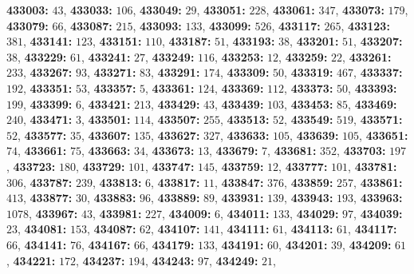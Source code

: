\textsf{\bfseries 433003:} $43$, \textsf{\bfseries 433033:} $106$, \textsf{\bfseries 433049:} $29$, \textsf{\bfseries 433051:} $228$, \textsf{\bfseries 433061:} $347$, \textsf{\bfseries 433073:} $179$, \textsf{\bfseries 433079:} $66$, \textsf{\bfseries 433087:} $215$, \textsf{\bfseries 433093:} $133$, \textsf{\bfseries 433099:} $526$, \textsf{\bfseries 433117:} $265$, \textsf{\bfseries 433123:} $381$, \textsf{\bfseries 433141:} $123$, \textsf{\bfseries 433151:} $110$, \textsf{\bfseries 433187:} $51$, \textsf{\bfseries 433193:} $38$, \textsf{\bfseries 433201:} $51$, \textsf{\bfseries 433207:} $38$, \textsf{\bfseries 433229:} $61$, \textsf{\bfseries 433241:} $27$, \textsf{\bfseries 433249:} $116$, \textsf{\bfseries 433253:} $12$, \textsf{\bfseries 433259:} $22$, \textsf{\bfseries 433261:} $233$, \textsf{\bfseries 433267:} $93$, \textsf{\bfseries 433271:} $83$, \textsf{\bfseries 433291:} $174$, \textsf{\bfseries 433309:} $50$, \textsf{\bfseries 433319:} $467$, \textsf{\bfseries 433337:} $192$, \textsf{\bfseries 433351:} $53$, \textsf{\bfseries 433357:} $5$, \textsf{\bfseries 433361:} $124$, \textsf{\bfseries 433369:} $112$, \textsf{\bfseries 433373:} $50$, \textsf{\bfseries 433393:} $199$, \textsf{\bfseries 433399:} $6$, \textsf{\bfseries 433421:} $213$, \textsf{\bfseries 433429:} $43$, \textsf{\bfseries 433439:} $103$, \textsf{\bfseries 433453:} $85$, \textsf{\bfseries 433469:} $240$, \textsf{\bfseries 433471:} $3$, \textsf{\bfseries 433501:} $114$, \textsf{\bfseries 433507:} $255$, \textsf{\bfseries 433513:} $52$, \textsf{\bfseries 433549:} $519$, \textsf{\bfseries 433571:} $52$, \textsf{\bfseries 433577:} $35$, \textsf{\bfseries 433607:} $135$, \textsf{\bfseries 433627:} $327$, \textsf{\bfseries 433633:} $105$, \textsf{\bfseries 433639:} $105$, \textsf{\bfseries 433651:} $74$, \textsf{\bfseries 433661:} $75$, \textsf{\bfseries 433663:} $34$, \textsf{\bfseries 433673:} $13$, \textsf{\bfseries 433679:} $7$, \textsf{\bfseries 433681:} $352$, \textsf{\bfseries 433703:} $197$, \textsf{\bfseries 433723:} $180$, \textsf{\bfseries 433729:} $101$, \textsf{\bfseries 433747:} $145$, \textsf{\bfseries 433759:} $12$, \textsf{\bfseries 433777:} $101$, \textsf{\bfseries 433781:} $306$, \textsf{\bfseries 433787:} $239$, \textsf{\bfseries 433813:} $6$, \textsf{\bfseries 433817:} $11$, \textsf{\bfseries 433847:} $376$, \textsf{\bfseries 433859:} $257$, \textsf{\bfseries 433861:} $413$, \textsf{\bfseries 433877:} $30$, \textsf{\bfseries 433883:} $96$, \textsf{\bfseries 433889:} $89$, \textsf{\bfseries 433931:} $139$, \textsf{\bfseries 433943:} $193$, \textsf{\bfseries 433963:} $1078$, \textsf{\bfseries 433967:} $43$, \textsf{\bfseries 433981:} $227$, \textsf{\bfseries 434009:} $6$, \textsf{\bfseries 434011:} $133$, \textsf{\bfseries 434029:} $97$, \textsf{\bfseries 434039:} $23$, \textsf{\bfseries 434081:} $153$, \textsf{\bfseries 434087:} $62$, \textsf{\bfseries 434107:} $141$, \textsf{\bfseries 434111:} $61$, \textsf{\bfseries 434113:} $61$, \textsf{\bfseries 434117:} $66$, \textsf{\bfseries 434141:} $76$, \textsf{\bfseries 434167:} $66$, \textsf{\bfseries 434179:} $133$, \textsf{\bfseries 434191:} $60$, \textsf{\bfseries 434201:} $39$, \textsf{\bfseries 434209:} $61$, \textsf{\bfseries 434221:} $172$, \textsf{\bfseries 434237:} $194$, \textsf{\bfseries 434243:} $97$, \textsf{\bfseries 434249:} $21$, 
